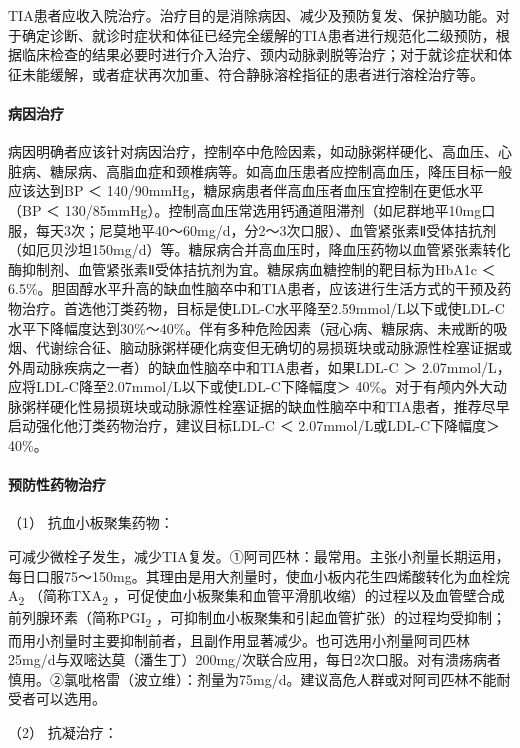 TIA患者应收入院治疗。治疗目的是消除病因、减少及预防复发、保护脑功能。对于确定诊断、就诊时症状和体征已经完全缓解的TIA患者进行规范化二级预防，根据临床检查的结果必要时进行介入治疗、颈内动脉剥脱等治疗；对于就诊症状和体征未能缓解，或者症状再次加重、符合静脉溶栓指征的患者进行溶栓治疗等。

\paragraph{病因治疗}

病因明确者应该针对病因治疗，控制卒中危险因素，如动脉粥样硬化、高血压、心脏病、糖尿病、高脂血症和颈椎病等。如高血压患者应控制高血压，降压目标一般应该达到BP
＜ 140/90mmHg，糖尿病患者伴高血压者血压宜控制在更低水平（BP ＜
130/85mmHg）。控制高血压常选用钙通道阻滞剂（如尼群地平10mg口服，每天3次；尼莫地平40～60mg/d，分2～3次口服）、血管紧张素Ⅱ受体拮抗剂（如厄贝沙坦150mg/d）等。糖尿病合并高血压时，降血压药物以血管紧张素转化酶抑制剂、血管紧张素Ⅱ受体拮抗剂为宜。糖尿病血糖控制的靶目标为HbA1c
＜
6.5\%。胆固醇水平升高的缺血性脑卒中和TIA患者，应该进行生活方式的干预及药物治疗。首选他汀类药物，目标是使LDL-C水平降至2.59mmol/L以下或使LDL-C水平下降幅度达到30\%～40\%。伴有多种危险因素（冠心病、糖尿病、未戒断的吸烟、代谢综合征、脑动脉粥样硬化病变但无确切的易损斑块或动脉源性栓塞证据或外周动脉疾病之一者）的缺血性脑卒中和TIA患者，如果LDL-C
＞ 2.07mmol/L，应将LDL-C降至2.07mmol/L以下或使LDL-C下降幅度＞
40\%。对于有颅内外大动脉粥样硬化性易损斑块或动脉源性栓塞证据的缺血性脑卒中和TIA患者，推荐尽早启动强化他汀类药物治疗，建议目标LDL-C
＜ 2.07mmol/L或LDL-C下降幅度＞ 40\%。

\paragraph{预防性药物治疗}

\hypertarget{text00241.htmlux5cux23CHP8-1-1-3-2-1}{}
（1） 抗血小板聚集药物：

可减少微栓子发生，减少TIA复发。①阿司匹林：最常用。主张小剂量长期运用，每日口服75～150mg。其理由是用大剂量时，使血小板内花生四烯酸转化为血栓烷A\textsubscript{2}
（简称TXA\textsubscript{2}
，可促使血小板聚集和血管平滑肌收缩）的过程以及血管壁合成前列腺环素（简称PGI\textsubscript{2}
，可抑制血小板聚集和引起血管扩张）的过程均受抑制；而用小剂量时主要抑制前者，且副作用显著减少。也可选用小剂量阿司匹林25mg/d与双嘧达莫（潘生丁）200mg/次联合应用，每日2次口服。对有溃疡病者慎用。②氯吡格雷（波立维）：剂量为75mg/d。建议高危人群或对阿司匹林不能耐受者可以选用。

\hypertarget{text00241.htmlux5cux23CHP8-1-1-3-2-2}{}
（2） 抗凝治疗：


